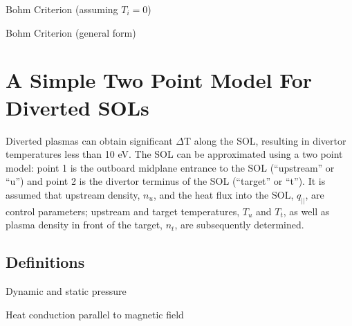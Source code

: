 \noindent
Bohm Criterion (assuming $T_i = 0$) 

\noindent
Bohm Criterion (general form) 

\section{A Simple Two Point Model For Diverted SOLs}
Diverted plasmas can obtain significant $\Delta$T along the SOL,
resulting in divertor temperatures less than 10 eV.  The SOL can be
approximated using a two point model: point 1 is the outboard midplane
entrance to the SOL (``upstream'' or ``u'') and point 2 is the
divertor terminus of the SOL (``target'' or ``t'').  It is assumed
that upstream density, $n_u$, and the heat flux into the SOL,
$q_{||}$, are control parameters; upstream and target temperatures,
$T_u$ and $T_t$, as well as plasma density in front of the target,
$n_t$, are subsequently determined.

\subsection{Definitions}

\noindent
Dynamic and static pressure 

\noindent
Heat conduction parallel to magnetic field 

